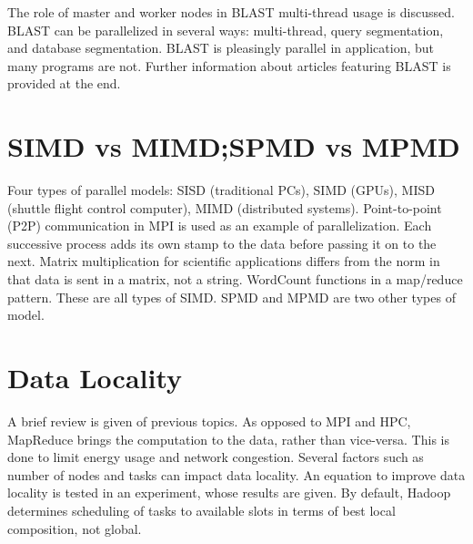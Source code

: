The role of master and worker nodes in BLAST multi-thread usage is
discussed. BLAST can be parallelized in several ways: multi-thread,
query segmentation, and database segmentation. BLAST is pleasingly
parallel in application, but many programs are not. Further information
about articles featuring BLAST is provided at the end.




\section{SIMD vs MIMD;SPMD vs MPMD}

Four types of parallel models: SISD (traditional PCs), SIMD (GPUs), MISD
(shuttle flight control computer), MIMD (distributed systems).
Point-to-point (P2P) communication in MPI is used as an example of
parallelization. Each successive process adds its own stamp to the data
before passing it on to the next. Matrix multiplication for scientific
applications differs from the norm in that data is sent in a matrix, not
a string. WordCount functions in a map/reduce pattern. These are all
types of SIMD. SPMD and MPMD are two other types of model.




\section{Data Locality}

A brief review is given of previous topics. As opposed to MPI and HPC,
MapReduce brings the computation to the data, rather than vice-versa.
This is done to limit energy usage and network congestion. Several
factors such as number of nodes and tasks can impact data locality. An
equation to improve data locality is tested in an experiment, whose
results are given. By default, Hadoop determines scheduling of tasks to
available slots in terms of best local composition, not global.

